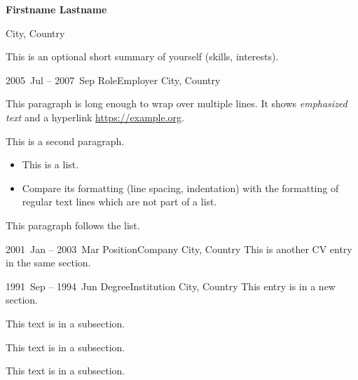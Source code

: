 \documentclass[a4paper]{article}
\begin{document}
\begin{center}
	\textbf{\large Firstname Lastname}

	City, Country

\end{center}

\begin{center}
	This is an optional short summary of yourself (skills, interests).
\end{center}




\entry
{2005~Jul -- 2007~Sep}
{Role}{Employer}
{City, Country}
{This paragraph is long enough to wrap over multiple lines.
It shows \emph{emphasized text} and a hyperlink \url{https://example.org}.

This is a second paragraph.

\begin{itemize}
	\item This is a list.
	\item Compare its formatting (line spacing, indentation)
		with the formatting of regular text lines
		which are not part of a list.
\end{itemize}

This paragraph follows the list.}

\medskip
\entry
{2001~Jan -- 2003~Mar}
{Position}{Company}
{City, Country}
{This is another CV entry in the same section.}


\entry
{1991~Sep -- 1994~Jun}
{Degree}{Institution}
{City, Country}
{This entry is in a new section.}



This text is in a subsection.


This text is in a subsection.


This text is in a subsection.
\end{document}
